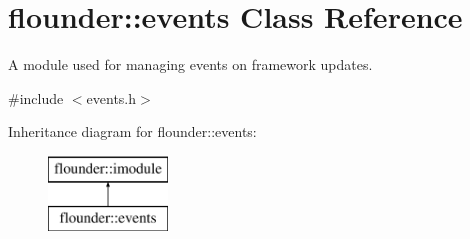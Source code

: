 \hypertarget{classflounder_1_1events}{}\section{flounder\+:\+:events Class Reference}
\label{classflounder_1_1events}


A module used for managing events on framework updates.  




{\ttfamily \#include $<$events.\+h$>$}

Inheritance diagram for flounder\+:\+:events\+:\begin{figure}[H]
\begin{center}
\leavevmode
\includegraphics[height=2.000000cm]{classflounder_1_1events}
\end{center}
\end{figure}
